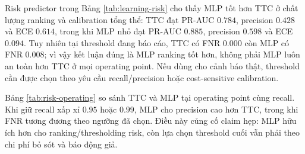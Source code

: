 \documentclass[10pt,letterpaper,twocolumn]{article}
\begin{document}
Risk predictor trong Bảng \ref{tab:learning-risk} cho thấy MLP tốt hơn TTC ở chất lượng ranking và calibration tổng thể: TTC đạt PR-AUC \(0.784\), precision \(0.428\) và ECE \(0.614\), trong khi MLP nhỏ đạt PR-AUC \(0.885\), precision \(0.598\) và ECE \(0.094\). Tuy nhiên tại threshold đang báo cáo, TTC có FNR \(0.000\) còn MLP có FNR \(0.008\); vì vậy kết luận đúng là MLP ranking tốt hơn, không phải MLP luôn an toàn hơn TTC ở mọi operating point. Nếu dùng cho cảnh báo thật, threshold cần được chọn theo yêu cầu recall/precision hoặc cost-sensitive calibration.

\begin{table}[!t]
\centering
\footnotesize
\caption{Kết quả learning/risk chính trên ODA-Bench.}
\label{tab:learning-risk}
\end{table}

\begin{table}[!t]
\centering
\footnotesize
\caption{Risk operating point trên cùng test split.}
\label{tab:risk-operating}
\end{table}

Bảng \ref{tab:risk-operating} so sánh TTC và MLP tại operating point cùng recall. Khi giữ recall xấp xỉ \(0.95\) hoặc \(0.99\), MLP cho precision cao hơn TTC, trong khi FNR tương đương theo ngưỡng đã chọn. Điều này củng cố claim hẹp: MLP hữu ích hơn cho ranking/thresholding risk, còn lựa chọn threshold cuối vẫn phải theo chi phí bỏ sót và báo động giả.
\end{document}
